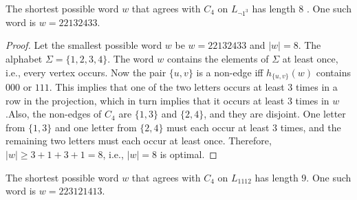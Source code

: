 \documentclass[runningheads]{llncs}
\begin{document}
\begin{proposition}
The shortest possible word $w$ that agrees with $C_4$ on $L_{\neg 1^{3}}$ has length $8$ . One such word is $w = 22132433$.
\end{proposition}



%
%
\begin{proof}
Let the smallest possible word $w$ be $w = 22132433$ and $|w| = 8$. The alphabet $\Sigma = \{1,2,3,4\}.$ The word $w$ contains the elements of $\Sigma$ at least once, i.e., every vertex occurs. Now the pair $\{u,v\}$ is a non-edge iff $h_{\{u,v\}}(w)$ contains $000$ or $111$. This implies that one of the two letters occurs at least $3$ times in a row in the projection, which in turn implies that it occurs at least $3$ times in $w$.Also, the non-edges of $C_4$ are $\{1,3\}$ and $\{2,4\}$, and they are disjoint. One letter from $\{1,3\}$ and one letter from $\{2,4\}$ must each occur at least $3$ times, and the remaining two letters must each occur at least once. Therefore, $|w| \geq 3+1+3+1 = 8$, i.e., $|w| = 8$ is optimal.
\end{proof}

\begin{proposition}
The shortest possible word $w$ that agrees with $C_4$ on $L_{1112}$ has length $9$. One such word is $w = 223121413$.
\end{proposition}
\end{document}
